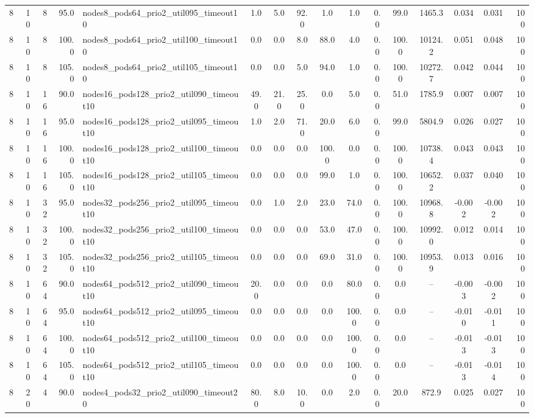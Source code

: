 \begin{tabular}{r r r r l c c c c c c c c c c r}
8 & 10 & 8 & 95.0 & nodes8\_pods64\_prio2\_util095\_timeout10 & 1.0 & 5.0 & 92.0 & 1.0 & 1.0 & 0.0 & 99.0 & 1465.3 & 0.034 & 0.031 & 100 \\
8 & 10 & 8 & 100.0 & nodes8\_pods64\_prio2\_util100\_timeout10 & 0.0 & 0.0 & 8.0 & 88.0 & 4.0 & 0.0 & 100.0 & 10124.2 & 0.051 & 0.048 & 100 \\
8 & 10 & 8 & 105.0 & nodes8\_pods64\_prio2\_util105\_timeout10 & 0.0 & 0.0 & 5.0 & 94.0 & 1.0 & 0.0 & 100.0 & 10272.7 & 0.042 & 0.044 & 100 \\
8 & 10 & 16 & 90.0 & nodes16\_pods128\_prio2\_util090\_timeout10 & 49.0 & 21.0 & 25.0 & 0.0 & 5.0 & 0.0 & 51.0 & 1785.9 & 0.007 & 0.007 & 100 \\
8 & 10 & 16 & 95.0 & nodes16\_pods128\_prio2\_util095\_timeout10 & 1.0 & 2.0 & 71.0 & 20.0 & 6.0 & 0.0 & 99.0 & 5804.9 & 0.026 & 0.027 & 100 \\
8 & 10 & 16 & 100.0 & nodes16\_pods128\_prio2\_util100\_timeout10 & 0.0 & 0.0 & 0.0 & 100.0 & 0.0 & 0.0 & 100.0 & 10738.4 & 0.043 & 0.043 & 100 \\
8 & 10 & 16 & 105.0 & nodes16\_pods128\_prio2\_util105\_timeout10 & 0.0 & 0.0 & 0.0 & 99.0 & 1.0 & 0.0 & 100.0 & 10652.2 & 0.037 & 0.040 & 100 \\
8 & 10 & 32 & 95.0 & nodes32\_pods256\_prio2\_util095\_timeout10 & 0.0 & 1.0 & 2.0 & 23.0 & 74.0 & 0.0 & 100.0 & 10968.8 & -0.002 & -0.002 & 100 \\
8 & 10 & 32 & 100.0 & nodes32\_pods256\_prio2\_util100\_timeout10 & 0.0 & 0.0 & 0.0 & 53.0 & 47.0 & 0.0 & 100.0 & 10992.0 & 0.012 & 0.014 & 100 \\
8 & 10 & 32 & 105.0 & nodes32\_pods256\_prio2\_util105\_timeout10 & 0.0 & 0.0 & 0.0 & 69.0 & 31.0 & 0.0 & 100.0 & 10953.9 & 0.013 & 0.016 & 100 \\
8 & 10 & 64 & 90.0 & nodes64\_pods512\_prio2\_util090\_timeout10 & 20.0 & 0.0 & 0.0 & 0.0 & 80.0 & 0.0 & 0.0 & -- & -0.003 & -0.002 & 100 \\
8 & 10 & 64 & 95.0 & nodes64\_pods512\_prio2\_util095\_timeout10 & 0.0 & 0.0 & 0.0 & 0.0 & 100.0 & 0.0 & 0.0 & -- & -0.010 & -0.011 & 100 \\
8 & 10 & 64 & 100.0 & nodes64\_pods512\_prio2\_util100\_timeout10 & 0.0 & 0.0 & 0.0 & 0.0 & 100.0 & 0.0 & 0.0 & -- & -0.013 & -0.013 & 100 \\
8 & 10 & 64 & 105.0 & nodes64\_pods512\_prio2\_util105\_timeout10 & 0.0 & 0.0 & 0.0 & 0.0 & 100.0 & 0.0 & 0.0 & -- & -0.013 & -0.014 & 100 \\
8 & 20 & 4 & 90.0 & nodes4\_pods32\_prio2\_util090\_timeout20 & 80.0 & 8.0 & 10.0 & 0.0 & 2.0 & 0.0 & 20.0 & 872.9 & 0.025 & 0.027 & 100 \\

\end{tabular}
